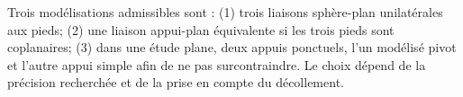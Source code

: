 \begin{corrigebox}
Trois modélisations admissibles sont : (1) trois liaisons sphère-plan unilatérales aux pieds; (2) une liaison appui-plan équivalente si les trois pieds sont coplanaires; (3) dans une étude plane, deux appuis ponctuels, l'un modélisé pivot et l'autre appui simple afin de ne pas surcontraindre. Le choix dépend de la précision recherchée et de la prise en compte du décollement.
\end{corrigebox}
